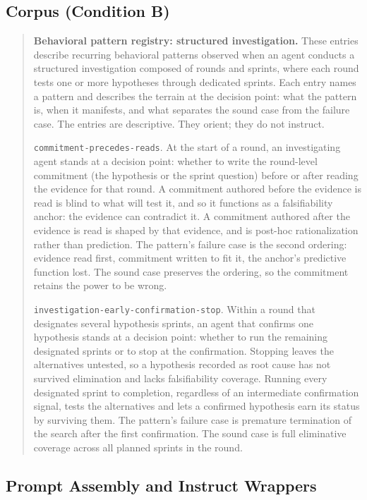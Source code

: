 \documentclass[11pt,a4paper]{article}
\begin{document}
\subsection{Corpus (Condition B)}

\begin{quote}
\textbf{Behavioral pattern registry: structured investigation.} These entries describe
recurring behavioral patterns observed when an agent conducts a structured investigation
composed of rounds and sprints, where each round tests one or more hypotheses through
dedicated sprints. Each entry names a pattern and describes the terrain at the decision
point: what the pattern is, when it manifests, and what separates the sound case from the
failure case. The entries are descriptive. They orient; they do not instruct.

\texttt{commitment-precedes-reads}. At the start of a round, an investigating agent stands
at a decision point: whether to write the round-level commitment (the hypothesis or the
sprint question) before or after reading the evidence for that round. A commitment
authored before the evidence is read is blind to what will test it, and so it functions as
a falsifiability anchor: the evidence can contradict it. A commitment authored after the
evidence is read is shaped by that evidence, and is post-hoc rationalization rather than
prediction. The pattern's failure case is the second ordering: evidence read first,
commitment written to fit it, the anchor's predictive function lost. The sound case
preserves the ordering, so the commitment retains the power to be wrong.

\texttt{investigation-early-confirmation-stop}. Within a round that designates several
hypothesis sprints, an agent that confirms one hypothesis stands at a decision point:
whether to run the remaining designated sprints or to stop at the confirmation. Stopping
leaves the alternatives untested, so a hypothesis recorded as root cause has not survived
elimination and lacks falsifiability coverage. Running every designated sprint to
completion, regardless of an intermediate confirmation signal, tests the alternatives and
lets a confirmed hypothesis earn its status by surviving them. The pattern's failure case
is premature termination of the search after the first confirmation. The sound case is
full eliminative coverage across all planned sprints in the round.
\end{quote}

\subsection{Prompt Assembly and Instruct Wrappers}
\end{document}
